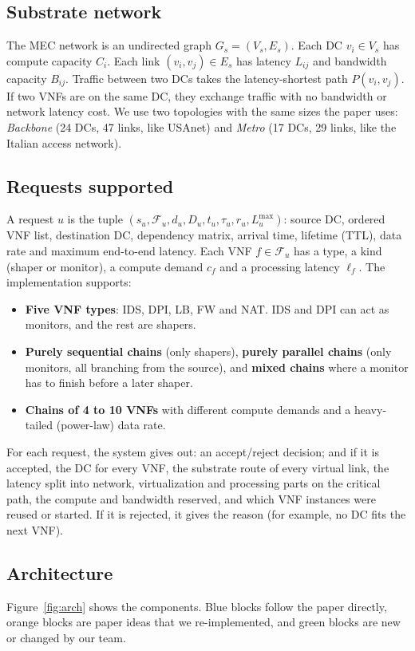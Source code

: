 \documentclass[11pt,a4paper]{article}
\begin{document}
\subsection{Substrate network}
The MEC network is an undirected graph $G_s=(V_s,E_s)$. Each DC
$v_i\in V_s$ has compute capacity $C_i$. Each link $(v_i,v_j)\in E_s$ has
latency $L_{ij}$ and bandwidth capacity $B_{ij}$. Traffic between two DCs takes
the latency-shortest path $P(v_i,v_j)$. If two VNFs are on the same DC, they
exchange traffic with no bandwidth or network latency cost. We use two
topologies with the same sizes the paper uses: \emph{Backbone} (24 DCs, 47
links, like USAnet) and \emph{Metro} (17 DCs, 29 links, like the Italian access
network).

\subsection{Requests supported}
A request $u$ is the tuple
$(s_u, \mathcal{F}_u, d_u, D_u, t_u, \tau_u, r_u, L^{\max}_u)$: source DC,
ordered VNF list, destination DC, dependency matrix, arrival time, lifetime
(TTL), data rate and maximum end-to-end latency. Each VNF $f\in\mathcal{F}_u$
has a type, a kind (shaper or monitor), a compute demand $c_f$ and a processing
latency $\ell_f$. The implementation supports:
\begin{itemize}
  \item \textbf{Five VNF types}: IDS, DPI, LB, FW and NAT. IDS and DPI can act
  as monitors, and the rest are shapers.
  \item \textbf{Purely sequential chains} (only shapers), \textbf{purely
  parallel chains} (only monitors, all branching from the source), and
  \textbf{mixed chains} where a monitor has to finish before a later shaper.
  \item \textbf{Chains of 4 to 10 VNFs} with different compute demands and a
  heavy-tailed (power-law) data rate.
\end{itemize}

For each request, the system gives out: an accept/reject decision; and if it is
accepted, the DC for every VNF, the substrate route of every virtual link, the
latency split into network, virtualization and processing parts on the critical
path, the compute and bandwidth reserved, and which VNF instances were reused or
started. If it is rejected, it gives the reason (for example, no DC fits the
next VNF).

\subsection{Architecture}
Figure~\ref{fig:arch} shows the components. Blue blocks follow the paper
directly, orange blocks are paper ideas that we re-implemented, and green blocks
are new or changed by our team.
\end{document}
